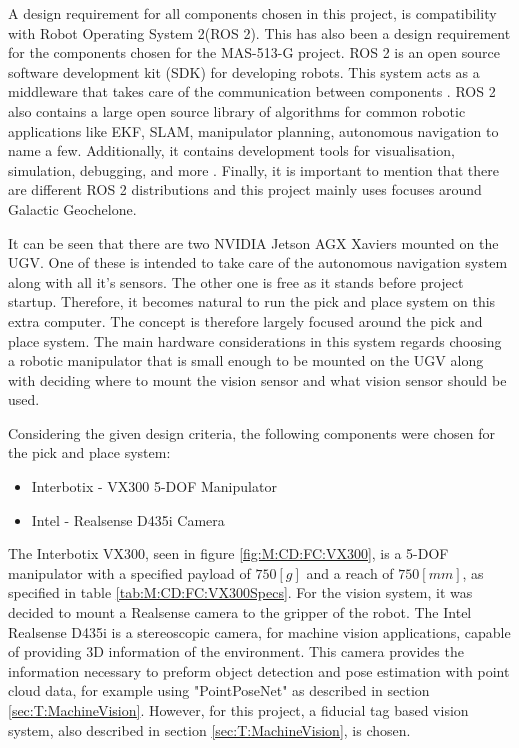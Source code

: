 A design requirement for all components chosen in this project, is compatibility with Robot Operating System 2(ROS 2). This has also been a design requirement for the components chosen for the MAS-513-G project. ROS 2 is an open source software development kit (SDK) for developing robots. This system acts as a middleware that takes care of the communication between components \cite{https://doi.org/10.48550/arxiv.1711.06396}. ROS 2 also contains a large open source library of algorithms for common robotic applications like EKF, SLAM, manipulator planning, autonomous navigation to name a few. Additionally, it contains development tools for visualisation, simulation, debugging, and more \cite{https://doi.org/10.48550/arxiv.1711.06396}. Finally, it is important to mention that there are different ROS 2 distributions and this project mainly uses focuses around Galactic Geochelone.

It can be seen that there are two NVIDIA Jetson AGX Xaviers mounted on the UGV. One of these is intended to take care of the autonomous navigation system along with all it's sensors. The other one is free as it stands before project startup. Therefore, it becomes natural to run the pick and place system on this extra computer. The concept is therefore largely focused around the pick and place system. The main hardware considerations in this system regards choosing a robotic manipulator that is small enough to be mounted on the UGV along with deciding where to mount the vision sensor and what vision sensor should be used. 

Considering the given design criteria, the following components were chosen for the pick and place system:

\begin{itemize}
    \item Interbotix - VX300 5-DOF Manipulator
    \item Intel - Realsense D435i Camera
\end{itemize}

 The Interbotix VX300, seen in figure \ref{fig:M:CD:FC:VX300}, is a 5-DOF manipulator with a specified payload of $750[g]$ and a reach of $750[mm]$, as specified in table \ref{tab:M:CD:FC:VX300Specs}. For the vision system, it was decided to mount a Realsense camera to the gripper of the robot. The Intel Realsense D435i is a stereoscopic camera, for machine vision applications, capable of providing 3D information of the environment. This camera provides the information necessary to preform object detection and pose estimation with point cloud data, for example using "PointPoseNet" as described in section \ref{sec:T:MachineVision}. However, for this project, a fiducial tag based vision system, also described in section \ref{sec:T:MachineVision}, is chosen.

